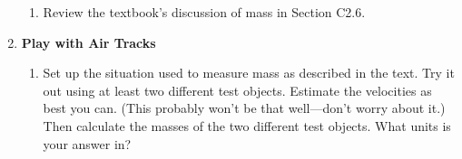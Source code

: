 \begin{enumerate}
\begin{enumerate}

\item Review the textbook's discussion of mass in Section C2.6.  

\end{enumerate}


\item {\bf Play with Air Tracks}

\begin{enumerate}

  \item Set up the situation used to measure mass as described in the
  text.  Try it out using at least two different test objects.
  Estimate the velocities as best you can.  (This probably won't be
  that well---don't worry about it.)  Then calculate the masses of the
  two different test objects.  What units is your answer in?

\end{enumerate}


\end{enumerate}



